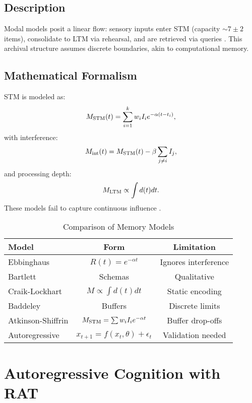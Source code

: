 \documentclass[12pt]{article}
\begin{document}
\subsection{Description}
Modal models posit a linear flow: sensory inputs enter STM (capacity $\sim 7 \pm 2$ items), consolidate to LTM via rehearsal, and are retrieved via queries \citep{AtkinsonShiffrin1968}. This archival structure assumes discrete boundaries, akin to computational memory.

\subsection{Mathematical Formalism}
STM is modeled as:
\begin{equation}
M_{\rm STM}(t) = \sum_{i=1}^{k} w_i I_i e^{-\alpha (t - t_i)},
\end{equation}
with interference:
\begin{equation}
M_{\rm int}(t) = M_{\rm STM}(t) - \beta \sum_{j \neq i} I_j,
\end{equation}
and processing depth:
\begin{equation}
M_{\rm LTM} \propto \int d(t) dt.
\end{equation}
These models fail to capture continuous influence \citep{Barenholtz2025}.

\begin{table}
\centering
\caption{Comparison of Memory Models}
\begin{tabular}{lcc}
\toprule
\textbf{Model} & \textbf{Form} & \textbf{Limitation} \\
\midrule
Ebbinghaus & $R(t) = e^{-\alpha t}$ & Ignores interference \\
Bartlett & Schemas & Qualitative \\
Craik-Lockhart & $M \propto \int d(t) dt$ & Static encoding \\
Baddeley & Buffers & Discrete limits \\
Atkinson-Shiffrin & $M_{\rm STM} = \sum w_i I_i e^{-\alpha t}$ & Buffer drop-offs \\
Autoregressive & $x_{t+1} = f(x_t, \theta) + \epsilon_t$ & Validation needed \\
\bottomrule
\end{tabular}
\label{tab:memory_models}
\end{table}

\section{Autoregressive Cognition with RAT}
\label{sec:rat_cognition}
\end{document}

